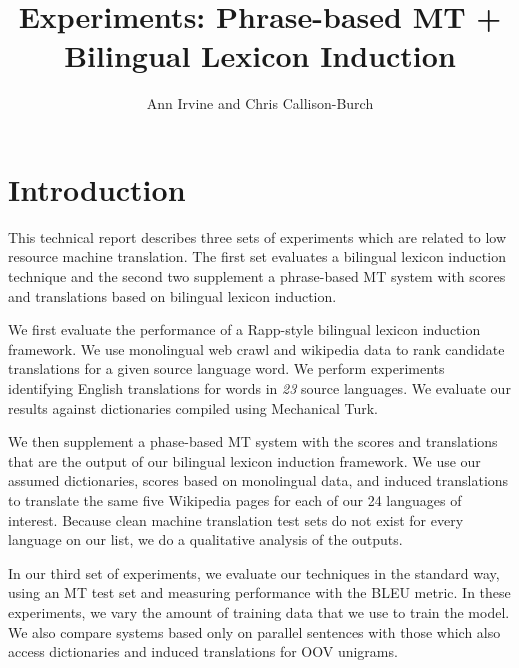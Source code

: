\documentclass[11pt]{article}
\title{Experiments: Phrase-based MT + Bilingual Lexicon Induction}
\author{Ann Irvine and Chris Callison-Burch}
\begin{document}
\maketitle

\section{Introduction}
This technical report describes three sets of experiments which are related to low resource machine translation. The first set evaluates a bilingual lexicon induction technique and the second two supplement a phrase-based MT system with scores and translations based on bilingual lexicon induction.

We first evaluate the performance of a Rapp-style \cite{Rapp:1995} bilingual lexicon induction framework. We use monolingual web crawl and wikipedia data to rank candidate translations for a given source language word. We perform experiments identifying English translations for words in {\it 23} source languages. We evaluate our results against dictionaries compiled using Mechanical Turk. 

We then supplement a phase-based MT system \cite{moses} with the scores and translations that are the output of our bilingual lexicon induction framework. We use our assumed dictionaries, scores based on monolingual data, and induced translations to translate the same five Wikipedia pages for each of our 24 languages of interest. Because clean machine translation test sets do not exist for every language on our list, we do a qualitative analysis of the outputs.

In our third set of experiments, we evaluate our techniques in the standard way, using an MT test set and measuring performance with the BLEU metric. In these experiments, we vary the amount of training data that we use to train the model. We also compare systems based only on parallel sentences with those which also access dictionaries and induced translations for OOV unigrams.


\end{document}

